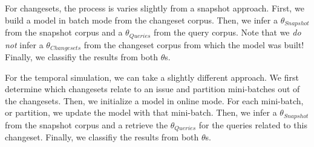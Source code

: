 For changesets, the process is varies slightly from a snapshot approach.
First, we build a model in batch mode from the changeset corpus.
Then, we infer a $\theta_{Snapshot}$ from the snapshot corpus
and a $\theta_{Queries}$ from the query corpus.
Note that we \emph{do not} infer a $\theta_{Changesets}$ from the changeset corpus from which the model was built!
Finally, we classifiy the results from both $\theta$s.

\begin{comment}
\begin{enumerate}
    \item Build model from the changeset corpus in batch mode
    \item \emph{Do not} infer a $\theta_{Changesets}$
    \item Infer a $\theta_{Snapshot}$ from the snapshot corpus
    \item Infer a  $\theta_{Queries}$ from the query corpus
    \item Classifiy, or rank, the results from both $\theta$s
\end{enumerate}
\end{comment}


For the temporal simulation, we can take a slightly different approach.
We first determine which changesets relate to an issue and partition mini-batches out of the changesets.
Then, we initialize a model in online mode.
For each mini-batch, or partition, we update the model with that mini-batch.
Then, we infer a $\theta_{Snapshot}$ from the snapshot corpus
and a retrieve the $\theta_{Queries}$ for the queries related to this changeset.
Finally, we classifiy the results from both $\theta$s.

\begin{comment}
\begin{enumerate}
    \item Initialize a model in online mode
    \item Determine which changesets relate to an issue and partition mini-batches out of the changesets
    \item For each mini-batch:
        \begin{enumerate}
            \item Update the model with mini-batch
            \item Update $\theta_{Snapshot}$ with the new inference of the source code document affected by this changeset
            \item Infer a $\theta_{Query}$ of the query related to the changeset we stopped at
            \item Classifiy, or rank, the results from both $\theta$s
        \end{enumerate}
\end{enumerate}
\end{comment}

